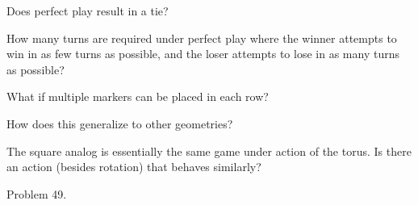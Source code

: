 \documentclass{article}
\begin{document}
\begin{related}
  \item Does perfect play result in a tie?
  \item How many turns are required under perfect play
    where the winner attempts to win in as few turns as possible, and the
    loser attempts to lose in as many turns as possible?
  \item What if multiple markers can be placed in each row?
  \item How does this generalize to other geometries?
  \item The square analog is essentially the same game under action of the
    torus. Is there an action (besides rotation) that behaves similarly?
\end{related}
\begin{references}
  \item Problem 49.
\end{references}
\end{document}
